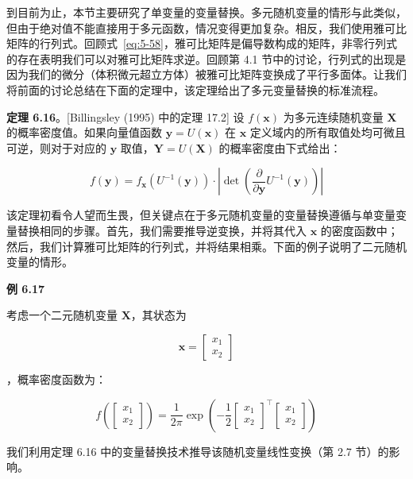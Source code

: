 到目前为止，本节主要研究了单变量的变量替换。多元随机变量的情形与此类似，但由于绝对值不能直接用于多元函数，情况变得更加复杂。相反，我们使用雅可比矩阵的行列式。回顾式~\eqref{eq:5-58}，雅可比矩阵是偏导数构成的矩阵，非零行列式的存在表明我们可以对雅可比矩阵求逆。回顾第 4.1 节中的讨论，行列式的出现是因为我们的微分（体积微元超立方体）被雅可比矩阵变换成了平行多面体。让我们将前面的讨论总结在下面的定理中，该定理给出了多元变量替换的标准流程。

\textbf{定理 6.16}。[Billingsley (1995) 中的定理 17.2] 设 $ f(\boldsymbol{x}) $ 为多元连续随机变量 $ \boldsymbol{X} $ 的概率密度值。如果向量值函数 $ \boldsymbol{y} = U(\boldsymbol{x}) $ 在 $ \boldsymbol{x} $ 定义域内的所有取值处均可微且可逆，则对于对应的 $ \boldsymbol{y} $ 取值，$ \boldsymbol{Y} = U(\boldsymbol{X}) $ 的概率密度由下式给出：

\begin{equation}
f(\boldsymbol{y}) = f_{\boldsymbol{x}}(U^{-1}(\boldsymbol{y})) \cdot \left| \det \left( \frac{\partial}{\partial \boldsymbol{y}} U^{-1}(\boldsymbol{y}) \right) \right|
\tag{6.144}\label{eq:6-144}
\end{equation}

该定理初看令人望而生畏，但关键点在于多元随机变量的变量替换遵循与单变量变量替换相同的步骤。首先，我们需要推导逆变换，并将其代入 $ \boldsymbol{x} $ 的密度函数中；然后，我们计算雅可比矩阵的行列式，并将结果相乘。下面的例子说明了二元随机变量的情形。

\begin{notebox}
\textbf{例 6.17}
\end{notebox}

\begin{notebox}
考虑一个二元随机变量 $ \boldsymbol{X} $，其状态为

\begin{equation*}
\boldsymbol{x} = \begin{bmatrix} x_1 \\ x_2 \end{bmatrix}
\end{equation*}

，概率密度函数为：

\begin{equation}
f\left( \begin{bmatrix} x_1 \\ x_2 \end{bmatrix} \right) = \frac{1}{2\pi} \exp \left( -\frac{1}{2} \begin{bmatrix} x_1 \\ x_2 \end{bmatrix}^\top \begin{bmatrix} x_1 \\ x_2 \end{bmatrix} \right)
\tag{6.145}\label{eq:6-145}
\end{equation}

我们利用定理 6.16 中的变量替换技术推导该随机变量线性变换（第 2.7 节）的影响。
\end{notebox}


